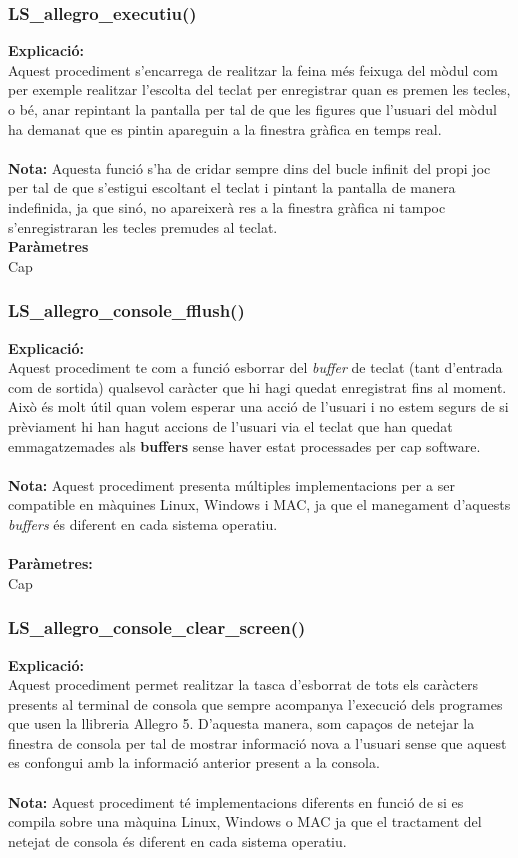 \documentclass[11pt]{article}
\begin{document}
\pagebreak
\subsubsection{LS\_allegro\_executiu()}
\textbf{Explicació:}\\
Aquest procediment s'encarrega de realitzar la feina més feixuga del mòdul com per exemple realitzar l'escolta del teclat per enregistrar quan es premen les tecles, o bé, anar repintant la pantalla per tal de que les figures que l'usuari del mòdul ha demanat que es pintin apareguin a la finestra gràfica en temps real. \\\\
\textbf{Nota:} Aquesta funció s'ha de cridar sempre dins del bucle infinit del propi joc per tal de que s'estigui escoltant el teclat i pintant la pantalla de manera indefinida, ja que sinó, no apareixerà res a la finestra gràfica ni tampoc s'enregistraran les tecles premudes al teclat.\\

\noindent \textbf{Paràmetres}\\
Cap

\subsubsection{LS\_allegro\_console\_fflush()}
\textbf{Explicació:}\\
Aquest procediment te com a funció esborrar del \textit{buffer} de teclat (tant d'entrada com de sortida) qualsevol caràcter que hi hagi quedat enregistrat fins al moment. Això és molt útil quan volem esperar una acció de l'usuari i no estem segurs de si prèviament hi han hagut accions de l'usuari via el teclat que han quedat emmagatzemades als \textbf{buffers} sense haver estat processades per cap software.\\\\
\textbf{Nota:} Aquest procediment presenta múltiples implementacions per a ser compatible en màquines Linux, Windows i MAC, ja que el manegament d'aquests \textit{buffers} és diferent en cada sistema operatiu.\\\\
\textbf{Paràmetres:}\\ Cap

\pagebreak
\subsubsection{LS\_allegro\_console\_clear\_screen()}
\textbf{Explicació:}\\
Aquest procediment permet realitzar la tasca d'esborrat de tots els caràcters presents al terminal de consola que sempre acompanya l'execució dels programes que usen la llibreria Allegro 5. D'aquesta manera, som capaços de netejar la finestra de consola per tal de mostrar informació nova a l'usuari sense que aquest es confongui amb la informació anterior present a la consola.\\\\
\textbf{Nota:} Aquest procediment té implementacions diferents en funció de si es compila sobre una màquina Linux, Windows o MAC ja que el tractament del netejat de consola és diferent en cada sistema operatiu.\\
\end{document}
